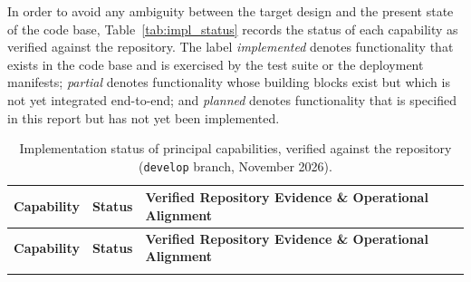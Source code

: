 In order to avoid any ambiguity between the target design and the present state of the code base, Table~\ref{tab:impl_status} records the status of each capability as verified against the repository. The label \textit{implemented} denotes functionality that exists in the code base and is exercised by the test suite or the deployment manifests; \textit{partial} denotes functionality whose building blocks exist but which is not yet integrated end-to-end; and \textit{planned} denotes functionality that is specified in this report but has not yet been implemented.

\begin{longtable}{@{}p{} p{} p{}@{}}
\caption{Implementation status of principal capabilities, verified against the repository (\texttt{develop} branch, November 2026).}
\label{tab:impl_status}\label{tab:implementation-status}\\
\toprule
\textbf{Capability} & \textbf{Status} & \textbf{Verified Repository Evidence \& Operational Alignment} \\
\midrule
\endfirsthead
\toprule
\textbf{Capability} & \textbf{Status} & \textbf{Verified Repository Evidence \& Operational Alignment} \\
\midrule
\endhead
\bottomrule
\endfoot


\end{longtable}
